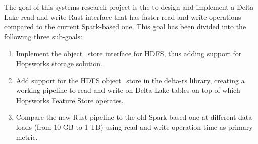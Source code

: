 The goal of this systems research project is the to design and implement a Delta Lake read and write Rust interface that has faster read and write operations compared to the current Spark-based one. This goal has been divided into the following three sub-goals:
\begin{enumerate}
\item Implement the object\_store interface for \gls{HDFS}, thus adding support for Hopsworks storage solution.
\item Add support for the \gls{HDFS} object\_store in the delta-rs library, creating a working pipeline to read and write on Delta Lake tables on top of which Hopsworks Feature Store operates.
\item Compare the new Rust pipeline to the old Spark-based one at different data loads (from 10 GB to 1 TB) using read and write operation time as primary metric.
\end{enumerate}

